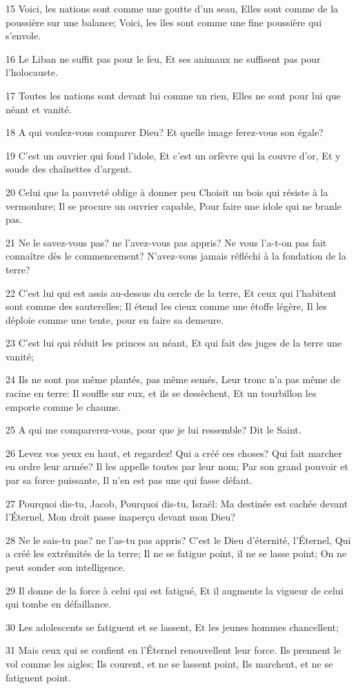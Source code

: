 \par 15 Voici, les nations sont comme une goutte d'un seau, Elles sont comme de la poussière sur une balance; Voici, les îles sont comme une fine poussière qui s'envole.
\par 16 Le Liban ne suffit pas pour le feu, Et ses animaux ne suffisent pas pour l'holocauste.
\par 17 Toutes les nations sont devant lui comme un rien, Elles ne sont pour lui que néant et vanité.
\par 18 A qui voulez-vous comparer Dieu? Et quelle image ferez-vous son égale?
\par 19 C'est un ouvrier qui fond l'idole, Et c'est un orfèvre qui la couvre d'or, Et y soude des chaînettes d'argent.
\par 20 Celui que la pauvreté oblige à donner peu Choisit un bois qui résiste à la vermoulure; Il se procure un ouvrier capable, Pour faire une idole qui ne branle pas.
\par 21 Ne le savez-vous pas? ne l'avez-vous pas appris? Ne vous l'a-t-on pas fait connaître dès le commencement? N'avez-vous jamais réfléchi à la fondation de la terre?
\par 22 C'est lui qui est assis au-dessus du cercle de la terre, Et ceux qui l'habitent sont comme des sauterelles; Il étend les cieux comme une étoffe légère, Il les déploie comme une tente, pour en faire sa demeure.
\par 23 C'est lui qui réduit les princes au néant, Et qui fait des juges de la terre une vanité;
\par 24 Ils ne sont pas même plantés, pas même semés, Leur tronc n'a pas même de racine en terre: Il souffle sur eux, et ils se dessèchent, Et un tourbillon les emporte comme le chaume.
\par 25 A qui me comparerez-vous, pour que je lui ressemble? Dit le Saint.
\par 26 Levez vos yeux en haut, et regardez! Qui a créé ces choses? Qui fait marcher en ordre leur armée? Il les appelle toutes par leur nom; Par son grand pouvoir et par sa force puissante, Il n'en est pas une qui fasse défaut.
\par 27 Pourquoi dis-tu, Jacob, Pourquoi dis-tu, Israël: Ma destinée est cachée devant l'Éternel, Mon droit passe inaperçu devant mon Dieu?
\par 28 Ne le sais-tu pas? ne l'as-tu pas appris? C'est le Dieu d'éternité, l'Éternel, Qui a créé les extrémités de la terre; Il ne se fatigue point, il ne se lasse point; On ne peut sonder son intelligence.
\par 29 Il donne de la force à celui qui est fatigué, Et il augmente la vigueur de celui qui tombe en défaillance.
\par 30 Les adolescents se fatiguent et se lassent, Et les jeunes hommes chancellent;
\par 31 Mais ceux qui se confient en l'Éternel renouvellent leur force. Ils prennent le vol comme les aigles; Ils courent, et ne se lassent point, Ils marchent, et ne se fatiguent point.

